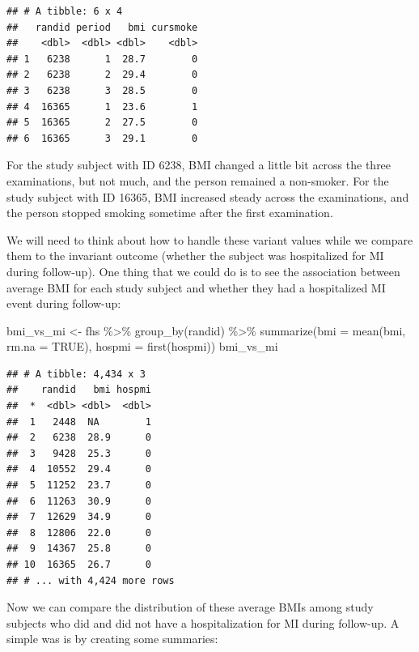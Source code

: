 \documentclass[
]{book}
\newenvironment{Shaded}{\begin{snugshade}}{\end{snugshade}}
\newcommand{\AttributeTok}[1]{\textcolor[rgb]{0.77,0.63,0.00}{#1}}
\newcommand{\ConstantTok}[1]{\textcolor[rgb]{0.00,0.00,0.00}{#1}}
\newcommand{\FunctionTok}[1]{\textcolor[rgb]{0.00,0.00,0.00}{#1}}
\newcommand{\NormalTok}[1]{#1}
\newcommand{\OtherTok}[1]{\textcolor[rgb]{0.56,0.35,0.01}{#1}}
\newcommand{\SpecialCharTok}[1]{\textcolor[rgb]{0.00,0.00,0.00}{#1}}
\begin{document}
\begin{verbatim}
## # A tibble: 6 x 4
##   randid period   bmi cursmoke
##    <dbl>  <dbl> <dbl>    <dbl>
## 1   6238      1  28.7        0
## 2   6238      2  29.4        0
## 3   6238      3  28.5        0
## 4  16365      1  23.6        1
## 5  16365      2  27.5        0
## 6  16365      3  29.1        0
\end{verbatim}

For the study subject with ID 6238, BMI changed a little bit across the three examinations, but not much, and the person remained a non-smoker. For the study subject with ID 16365, BMI increased steady across the examinations, and the person stopped smoking sometime after the first examination.

We will need to think about how to handle these variant values while we compare them to the invariant outcome (whether the subject was hospitalized for MI during follow-up). One thing that we could do is to see the association between average BMI for each study subject and whether they had a hospitalized MI event during follow-up:

\begin{Shaded}
\begin{Highlighting}[]
\NormalTok{bmi\_vs\_mi }\OtherTok{\textless{}{-}}\NormalTok{ fhs }\SpecialCharTok{\%\textgreater{}\%} 
  \FunctionTok{group\_by}\NormalTok{(randid) }\SpecialCharTok{\%\textgreater{}\%} 
  \FunctionTok{summarize}\NormalTok{(}\AttributeTok{bmi =} \FunctionTok{mean}\NormalTok{(bmi, }\AttributeTok{rm.na =} \ConstantTok{TRUE}\NormalTok{), }
            \AttributeTok{hospmi =} \FunctionTok{first}\NormalTok{(hospmi))}
\NormalTok{bmi\_vs\_mi}
\end{Highlighting}
\end{Shaded}

\begin{verbatim}
## # A tibble: 4,434 x 3
##    randid   bmi hospmi
##  *  <dbl> <dbl>  <dbl>
##  1   2448  NA        1
##  2   6238  28.9      0
##  3   9428  25.3      0
##  4  10552  29.4      0
##  5  11252  23.7      0
##  6  11263  30.9      0
##  7  12629  34.9      0
##  8  12806  22.0      0
##  9  14367  25.8      0
## 10  16365  26.7      0
## # ... with 4,424 more rows
\end{verbatim}

Now we can compare the distribution of these average BMIs among study subjects who did and did not have a hospitalization for MI during follow-up. A simple was is by creating some summaries:
\end{document}
